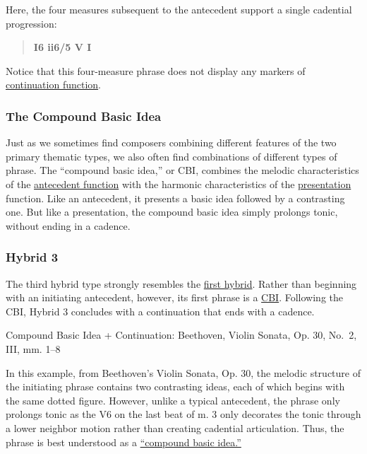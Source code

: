 \documentclass{book}
\begin{document}
Here, the four measures subsequent to the antecedent support a single
cadential progression:

\begin{quote}
\textbf{I6 ii6/5 V I}
\end{quote}

Notice that this four-measure phrase does not display any markers of
\href{themeFunctions.html\#continuation}{continuation function}.

\hypertarget{the-compound-basic-idea}{%
\subsubsection{The Compound Basic Idea}\label{the-compound-basic-idea}}

Just as we sometimes find composers combining different features of the two
primary thematic types, we also often find combinations of different types of
phrase. The ``compound basic idea,'' or CBI, combines the melodic
characteristics of the \href{themeFunctions.html\#antecedent}{antecedent
function} with the harmonic characteristics of the
\href{themeFunctions.html\#presentation}{presentation} function. Like an
antecedent, it presents a basic idea followed by a contrasting one. But like a
presentation, the compound basic idea simply prolongs tonic, without ending in
a cadence.

\hypertarget{hybrid-3}{%
\subsubsection{Hybrid 3}\label{hybrid-3}}

The third hybrid type strongly resembles the
\href{hybridThemes.html\#hybrid-1}{first hybrid}. Rather than beginning with
an initiating antecedent, however, its first phrase is a
\href{hybridThemes.html\#the-compound-basic-idea}{CBI}. Following the CBI,
Hybrid 3 concludes with a continuation that ends with a cadence.

Compound Basic Idea + Continuation: Beethoven, Violin Sonata, Op. 30, No.~2,
III, mm. 1--8

In this example, from Beethoven's Violin Sonata, Op. 30, the melodic structure
of the initiating phrase contains two contrasting ideas, each of which begins
with the same dotted figure. However, unlike a typical antecedent, the phrase
only prolongs tonic as the V6 on the last beat of m. 3 only decorates the
tonic through a lower neighbor motion rather than creating cadential
articulation. Thus, the phrase is best understood as a
\href{hybridThemes.html\#the-compound-basic-idea}{``compound basic idea.''}
\end{document}
